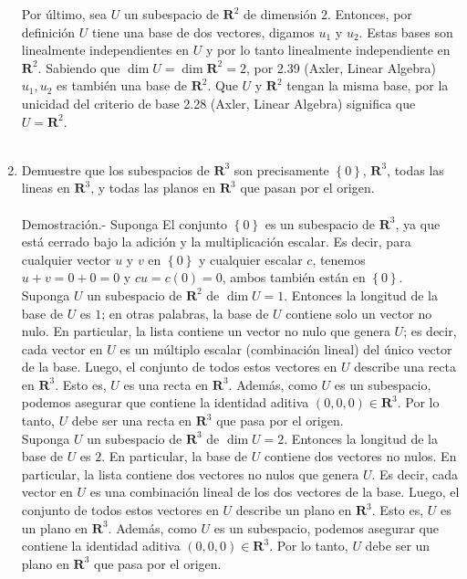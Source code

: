 \begin{enumerate}[\bfseries 1.]
	Por último, sea $U$ un subespacio de $\textbf{R}^2$ de dimensión $2$. Entonces, por definición $U$ tiene una base de dos vectores, digamos $u_1$ y $u_2$. Estas bases son linealmente independientes en $U$ y por lo tanto linealmente independiente en $\textbf{R}^2$. Sabiendo que $\dim U = \dim \textbf{R}^2=2$,  por 2.39 (Axler, Linear Algebra) $u_1,u_2$ es también una base de $\textbf{R}^2$. Que $U$ y $\textbf{R}^2$ tengan la misma base, por la unicidad del criterio de base 2.28 (Axler, Linear Algebra) significa que $U=\textbf{R}^2$.\\\\

    \item Demuestre que los subespacios de $\textbf{R}^3$ son precisamente $\left\{0\right\}$, $\textbf{R}^3$, todas las lineas en $\textbf{R}^3$, y todas las planos en $\textbf{R}^3$ que pasan por el origen.\\\\ 
	Demostración.-\; Suponga
	El conjunto $\left\{0\right\}$ es un subespacio de $\textbf{R}^3$, ya que está cerrado bajo la adición y la multiplicación escalar. Es decir, para cualquier vector $u$ y $v$ en $\left\{0\right\}$ y cualquier escalar $c$, tenemos $u+v=0+0=0$ y $c u =c(0)=0$, ambos también están en $\left\{0\right\}.$\\

	Suponga $U$ un subespacio de $\textbf{R}^2$ de $\dim U = 1$. Entonces la longitud de la base de $U$ es $1$; en otras palabras, la base de $U$ contiene solo un vector no nulo. En particular, la lista contiene un vector no nulo que genera $U$; es decir, cada vector en $U$ es un múltiplo escalar (combinación lineal) del único vector de la base. Luego, el conjunto de todos estos vectores en $U$ describe una recta en $\textbf{R}^3$. Esto es, $U$ es una recta en $\textbf{R}^3$. Además, como $U$ es un subespacio, podemos asegurar que contiene la identidad aditiva $(0,0,0)\in \textbf{R}^3$. Por lo tanto, $U$ debe ser una recta en $\textbf{R}^3$ que pasa por el origen.\\

	Suponga $U$ un subespacio de $\textbf{R}^3$ de $\dim U = 2$. Entonces la longitud de la base de $U$ es $2$. En particular, la base de $U$ contiene dos vectores no nulos. En particular, la lista contiene dos vectores no nulos que genera $U$. Es decir, cada vector en $U$ es una combinación lineal de los dos vectores de la base. Luego, el conjunto de todos estos vectores en $U$ describe un plano en $\textbf{R}^3$. Esto es, $U$ es un plano en $\textbf{R}^3$. Además, como $U$ es un subespacio, podemos asegurar que contiene la identidad aditiva $(0,0,0)\in \textbf{R}^3$. Por lo tanto, $U$ debe ser un plano en $\textbf{R}^3$ que pasa por el origen.\\
	

\end{enumerate}
